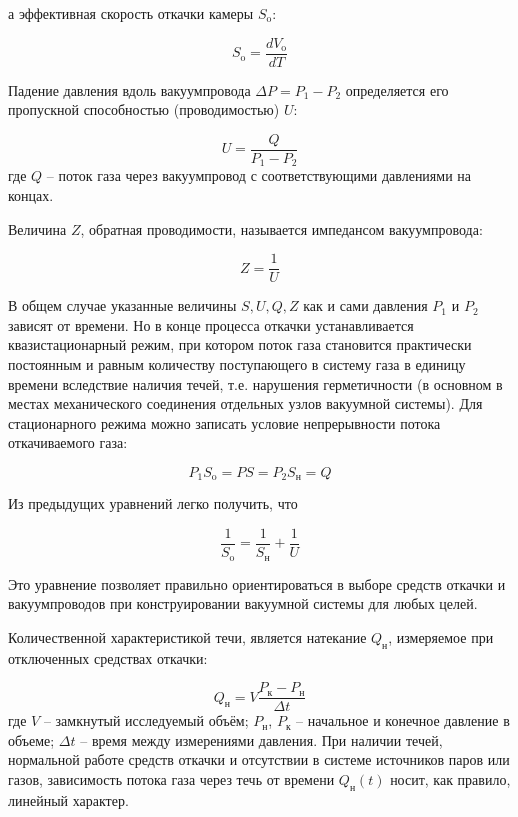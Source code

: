 \documentclass[a4paper, 12pt]{article} %
\begin{document}
а эффективная скорость откачки камеры $S_{\text{o}}$:

\begin{equation}
	S_{\text{o}} = \frac{dV_{\text{o}}}{dT}
\end{equation}

Падение давления вдоль вакуумпровода $\Delta P = P_1 - P_2$ определяется его пропускной способностью (проводимостью) $U$:

\begin{equation}
	U = \frac{Q}{P_1 - P_2}
\end{equation}
где $Q$ -- поток газа через вакуумпровод с соответствующими
давлениями на концах.

Величина $Z$, обратная проводимости, называется импедансом вакуумпровода:

\begin{equation}
	Z = \frac{1}{U}
\end{equation}

В общем случае указанные величины $S, U, Q, Z$ как и сами давления $P_1$ и $P_2$ зависят от времени. Но в конце процесса откачки устанавливается квазистационарный режим, при котором поток газа становится практически постоянным и равным количеству поступающего в систему газа
в единицу времени вследствие наличия течей, т.е. нарушения герметичности (в основном в местах механического соединения отдельных узлов
вакуумной системы). Для стационарного режима можно записать условие
непрерывности потока откачиваемого газа:

\begin{equation}
	P_1S_{\text{o}} = PS = P_2S_{\text{н}} = Q
\end{equation}

Из предыдущих уравнений легко получить, что

\begin{equation}
	\frac{1}{S_{\text{o}}} = \frac{1}{S_{\text{н}}} + \frac{1}{U}
\end{equation}

Это уравнение позволяет правильно ориентироваться в выборе средств
откачки и вакуумпроводов при конструировании вакуумной системы для
любых целей.

Количественной характеристикой течи, является натекание $Q_{\text{н}}$, измеряемое при отключенных средствах откачки:

\begin{equation}
	Q_{\text{н}} = V \frac{P_{\text{к}} - P_{\text{н}}}{\Delta t}
\end{equation}
где $V$ -- замкнутый исследуемый объём; $P_{\text{н}}$, $P_{\text{к}}$ -- начальное и конечное давление в объеме; $\Delta t$ -- время между измерениями давления. При наличии течей, нормальной работе средств откачки и отсутствии в системе
источников паров или газов, зависимость потока газа через течь от времени $Q_{\text{н}}(t)$ носит, как правило, линейный характер.
\end{document}
